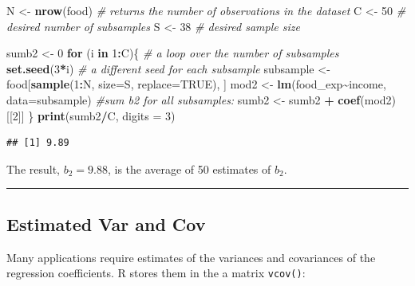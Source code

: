 \documentclass[
]{book}
\newenvironment{Shaded}{\begin{snugshade}}{\end{snugshade}}
\newcommand{\AttributeTok}[1]{\textcolor[rgb]{0.13,0.29,0.53}{#1}}
\newcommand{\CommentTok}[1]{\textcolor[rgb]{0.56,0.35,0.01}{\textit{#1}}}
\newcommand{\ConstantTok}[1]{\textcolor[rgb]{0.56,0.35,0.01}{#1}}
\newcommand{\ControlFlowTok}[1]{\textcolor[rgb]{0.13,0.29,0.53}{\textbf{#1}}}
\newcommand{\DecValTok}[1]{\textcolor[rgb]{0.00,0.00,0.81}{#1}}
\newcommand{\FunctionTok}[1]{\textcolor[rgb]{0.13,0.29,0.53}{\textbf{#1}}}
\newcommand{\NormalTok}[1]{#1}
\newcommand{\OtherTok}[1]{\textcolor[rgb]{0.56,0.35,0.01}{#1}}
\newcommand{\SpecialCharTok}[1]{\textcolor[rgb]{0.81,0.36,0.00}{\textbf{#1}}}
\begin{document}
\begin{Shaded}
\begin{Highlighting}[]
\NormalTok{N }\OtherTok{\textless{}{-}} \FunctionTok{nrow}\NormalTok{(food)   }\CommentTok{\# returns the number of observations in the dataset}
\NormalTok{C }\OtherTok{\textless{}{-}} \DecValTok{50}           \CommentTok{\# desired number of subsamples}
\NormalTok{S }\OtherTok{\textless{}{-}} \DecValTok{38}           \CommentTok{\# desired sample size}

\NormalTok{sumb2 }\OtherTok{\textless{}{-}} \DecValTok{0}
\ControlFlowTok{for}\NormalTok{ (i }\ControlFlowTok{in} \DecValTok{1}\SpecialCharTok{:}\NormalTok{C)\{   }\CommentTok{\# a loop over the number of subsamples}
  \FunctionTok{set.seed}\NormalTok{(}\DecValTok{3}\SpecialCharTok{*}\NormalTok{i)   }\CommentTok{\# a different seed for each subsample  }
\NormalTok{  subsample }\OtherTok{\textless{}{-}}\NormalTok{ food[}\FunctionTok{sample}\NormalTok{(}\DecValTok{1}\SpecialCharTok{:}\NormalTok{N, }\AttributeTok{size=}\NormalTok{S, }\AttributeTok{replace=}\ConstantTok{TRUE}\NormalTok{), ]}
\NormalTok{  mod2 }\OtherTok{\textless{}{-}} \FunctionTok{lm}\NormalTok{(food\_exp}\SpecialCharTok{\textasciitilde{}}\NormalTok{income, }\AttributeTok{data=}\NormalTok{subsample)}
  \CommentTok{\#sum b2 for all subsamples:}
\NormalTok{  sumb2 }\OtherTok{\textless{}{-}}\NormalTok{ sumb2 }\SpecialCharTok{+} \FunctionTok{coef}\NormalTok{(mod2)[[}\DecValTok{2}\NormalTok{]]}
\NormalTok{\}}
\FunctionTok{print}\NormalTok{(sumb2}\SpecialCharTok{/}\NormalTok{C, }\AttributeTok{digits =} \DecValTok{3}\NormalTok{)}
\end{Highlighting}
\end{Shaded}

\begin{verbatim}
## [1] 9.89
\end{verbatim}

The result, \(b_2=9.88\), is the average of 50 estimates of \(b_2\).

\begin{center}\rule{0.5\linewidth}{0.5pt}\end{center}

\hypertarget{estimated-var-and-cov}{%
\subsection{Estimated Var and Cov}\label{estimated-var-and-cov}}

Many applications require estimates of the variances and covariances of the regression coefficients. R stores them in the a matrix \texttt{vcov()}:
\end{document}
